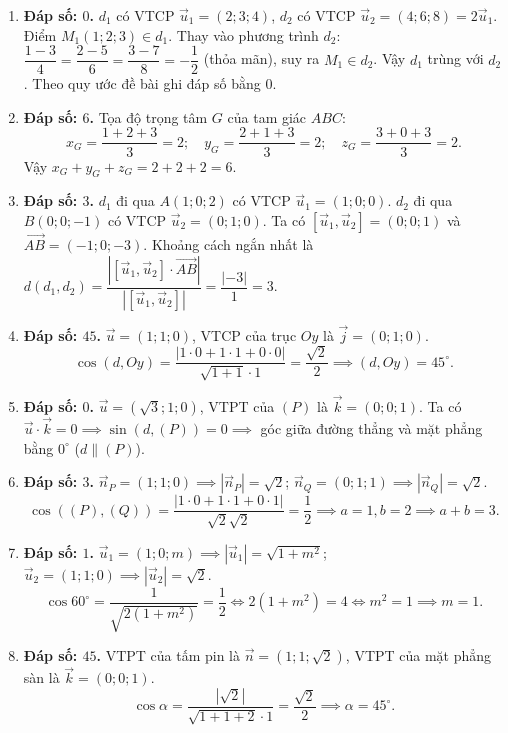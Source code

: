 \documentclass[12pt,a4paper]{article}
\begin{document}
\begin{enumerate}
\item \textbf{Đáp số: $0$.}  
$d_1$ có VTCP $\vec{u}_1 = (2; 3; 4)$, $d_2$ có VTCP $\vec{u}_2 = (4; 6; 8) = 2\vec{u}_1$.  
Điểm $M_1(1; 2; 3) \in d_1$. Thay vào phương trình $d_2$:  
$\dfrac{1 - 3}{4} = \dfrac{2 - 5}{6} = \dfrac{3 - 7}{8} = -\dfrac{1}{2}$ (thỏa mãn), suy ra $M_1 \in d_2$.  
Vậy $d_1$ trùng với $d_2$. Theo quy ước đề bài ghi đáp số bằng $0$.

\item \textbf{Đáp số: $6$.}  
Tọa độ trọng tâm $G$ của tam giác $ABC$:
\[
x_G = \dfrac{1 + 2 + 3}{3} = 2;\quad y_G = \dfrac{2 + 1 + 3}{3} = 2;\quad z_G = \dfrac{3 + 0 + 3}{3} = 2.
\]
Vậy $x_G + y_G + z_G = 2 + 2 + 2 = 6$.

\item \textbf{Đáp số: $3$.}  
$d_1$ đi qua $A(1; 0; 2)$ có VTCP $\vec{u}_1 = (1; 0; 0)$.  
$d_2$ đi qua $B(0; 0; -1)$ có VTCP $\vec{u}_2 = (0; 1; 0)$.  
Ta có $[\vec{u}_1, \vec{u}_2] = (0; 0; 1)$ và $\vec{AB} = (-1; 0; -3)$.  
Khoảng cách ngắn nhất là $d(d_1, d_2) = \dfrac{|[\vec{u}_1, \vec{u}_2] \cdot \vec{AB}|}{|[\vec{u}_1, \vec{u}_2]|} = \dfrac{|-3|}{1} = 3$.

\item \textbf{Đáp số: $45$.}  
$\vec{u} = (1; 1; 0)$, VTCP của trục $Oy$ là $\vec{j} = (0; 1; 0)$.
\[
\cos(d, Oy) = \dfrac{|1\cdot 0 + 1\cdot 1 + 0\cdot 0|}{\sqrt{1 + 1}\cdot 1} = \dfrac{\sqrt{2}}{2} \implies (d, Oy) = 45^\circ.
\]

\item \textbf{Đáp số: $0$.}  
$\vec{u} = (\sqrt{3}; 1; 0)$, VTPT của $(P)$ là $\vec{k} = (0; 0; 1)$.  
Ta có $\vec{u} \cdot \vec{k} = 0 \implies \sin(d, (P)) = 0 \implies$ góc giữa đường thẳng và mặt phẳng bằng $0^\circ$ ($d \parallel (P)$).

\item \textbf{Đáp số: $3$.}  
$\vec{n}_P = (1; 1; 0) \implies |\vec{n}_P| = \sqrt{2}$; $\vec{n}_Q = (0; 1; 1) \implies |\vec{n}_Q| = \sqrt{2}$.
\[
\cos((P), (Q)) = \dfrac{|1\cdot 0 + 1\cdot 1 + 0\cdot 1|}{\sqrt{2}\sqrt{2}} = \dfrac{1}{2} \implies a = 1, b = 2 \implies a + b = 3.
\]

\item \textbf{Đáp số: $1$.}  
$\vec{u}_1 = (1; 0; m) \implies |\vec{u}_1| = \sqrt{1 + m^2}$; $\vec{u}_2 = (1; 1; 0) \implies |\vec{u}_2| = \sqrt{2}$.
\[
\cos 60^\circ = \dfrac{1}{\sqrt{2(1 + m^2)}} = \dfrac{1}{2} \iff 2(1 + m^2) = 4 \iff m^2 = 1 \implies m = 1.
\]

\item \textbf{Đáp số: $45$.}  
VTPT của tấm pin là $\vec{n} = (1; 1; \sqrt{2})$, VTPT của mặt phẳng sàn là $\vec{k} = (0; 0; 1)$.
\[
\cos\alpha = \dfrac{|\sqrt{2}|}{\sqrt{1 + 1 + 2}\cdot 1} = \dfrac{\sqrt{2}}{2} \implies \alpha = 45^\circ.
\]


\end{enumerate}
\end{document}
